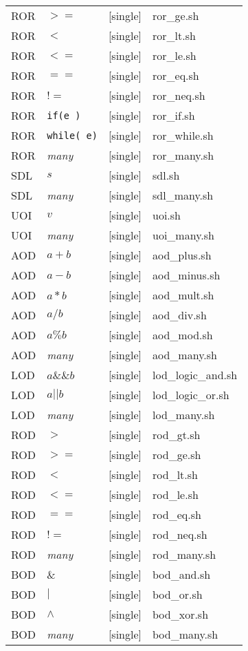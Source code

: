 \begin{table}[h]
\begin{tabular}{|llll|}
ROR	&	$>=$	&	[single]	&	ror\_ge.sh \\
ROR	&	$<$	&	[single]	&	ror\_lt.sh \\
ROR	&	$<=$	&	[single]	&	ror\_le.sh \\
ROR	&	$==$	&	[single]	&	ror\_eq.sh \\
ROR	&	$!=$	&	[single]	&	ror\_neq.sh \\
ROR	&	\texttt{if(e )}	&	[single]	&	ror\_if.sh \\
ROR	&	\texttt{while( e)}	&	[single]&	ror\_while.sh \\
ROR	&	\textit{many}&	[single]&	ror\_many.sh \\
SDL	&	$s$	&	[single]	&	sdl.sh \\
SDL	&	\textit{many}	&	[single]	&	sdl\_many.sh \\
UOI	&	$v$	&	[single]	&	uoi.sh \\
UOI	&	\textit{many}	&	[single]	&	uoi\_many.sh \\
AOD	&	$a + b$	&	[single]	&	aod\_plus.sh \\
AOD	&	$a - b$	&	[single]	&	aod\_minus.sh \\
AOD	&	$a * b$	&	[single]	&	aod\_mult.sh \\
AOD	&	$a / b$	&	[single]	&	aod\_div.sh \\
AOD	&	$a \% b$	&	[single]	&	aod\_mod.sh \\
AOD	&	\textit{many}	&	[single]	&	aod\_many.sh \\
LOD	&	$a \&\& b$	&	[single]	&	lod\_logic\_and.sh \\
LOD	&	$a || b$	&	[single]	&	lod\_logic\_or.sh \\
LOD	&	\textit{many}	&	[single]	&	lod\_many.sh \\
ROD	&	$>$	&	[single]	&	rod\_gt.sh \\
ROD	&	$>=$	&	[single]	&	rod\_ge.sh \\
ROD	&	$<$	&	[single]	&	rod\_lt.sh \\
ROD	&	$<=$	&	[single]	&	rod\_le.sh \\
ROD	&	$==$	&	[single]	&	rod\_eq.sh \\
ROD	&	$!=$	&	[single]	&	rod\_neq.sh \\
ROD	&	\textit{many}	&	[single]	&	rod\_many.sh \\
BOD	&	$\&$	&	[single]	&	bod\_and.sh \\
BOD	&	$|$	&	[single]	&	bod\_or.sh \\
BOD	&	$\land$	&	[single]	&	bod\_xor.sh \\
BOD	&	\textit{many}	&	[single]	&bod\_many.sh \\

\end{tabular}
\end{table}
